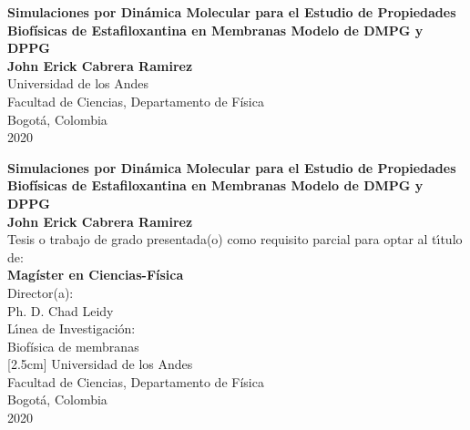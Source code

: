 \begin{center}
\begin{figure}
\centering%
%
\end{figure}
\thispagestyle{empty} \vspace*{1.7cm} \textbf{\huge
Simulaciones por Din\'{a}mica Molecular para el Estudio de Propiedades Biof\'{i}sicas de Estafiloxantina en Membranas Modelo de DMPG y DPPG}\\[5.0cm]
\Large\textbf{John Erick Cabrera Ramirez}\\[5.0cm]
\small Universidad de los Andes\\
Facultad de Ciencias, Departamento de F\'{i}sica\\
Bogot\'{a}, Colombia\\
2020\\
\end{center}

\newpage{\pagestyle{empty}\cleardoublepage}

\newpage
\begin{center}
\thispagestyle{empty} \vspace*{-1cm} \textbf{\huge
Simulaciones por Din\'{a}mica Molecular para el Estudio de Propiedades Biof\'{i}sicas de Estafiloxantina en Membranas Modelo de DMPG y DPPG}\\[3.0cm]
\Large\textbf{John Erick Cabrera Ramirez}\\[3.0cm]
\small Tesis o trabajo de grado presentada(o) como requisito parcial para optar al
t\'{\i}tulo de:\\
\textbf{Mag\'{i}ster en Ciencias-F\'{i}sica}\\[2.0cm]
Director(a):\\
Ph. D. Chad Leidy\\[2.0cm]
L\'{\i}nea de Investigaci\'{o}n:\\
Biof\'{i}sica de membranas\\
[2.5cm]
Universidad de los Andes\\
Facultad de Ciencias, Departamento de F\'{i}sica\\
Bogot\'{a}, Colombia\\
2020\\
\end{center}

